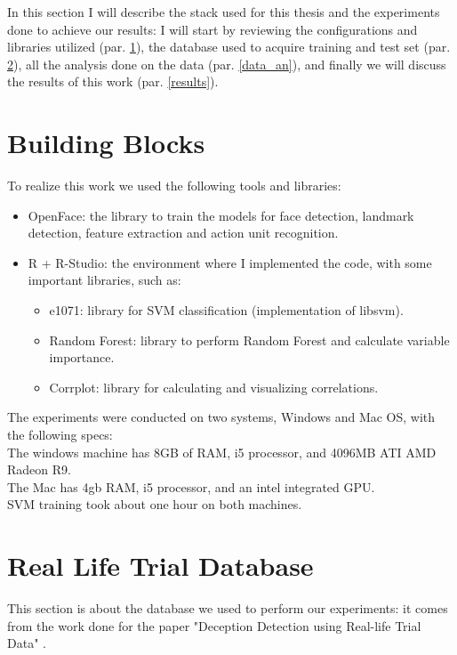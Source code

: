 In this section I will describe the stack used for this thesis and the experiments done to achieve our results: I will start by reviewing the configurations and libraries utilized (par. \ref{bb}), the database used to acquire training and test set (par. \ref{rldb}), all the analysis done on the data (par. \ref{data_an}), and finally we will discuss the results of this work (par. \ref{results}).

\section{Building Blocks} \label{bb}
To realize this work we used the following tools and libraries:
\begin{itemize}
	\item OpenFace: the library to train the models for face detection, landmark detection, feature extraction and action unit recognition.
	\item R + R-Studio: the environment where I implemented the code, with some important libraries, such as:
	\begin{itemize}
		\item e1071: library for SVM classification (implementation of libsvm).
		\item Random Forest: library to perform Random Forest and calculate variable importance.
		\item Corrplot: library for calculating and visualizing correlations.
	\end{itemize}
\end{itemize}

The experiments were conducted on two systems, Windows and Mac OS, with the following specs:\\
The windows machine has 8GB of RAM, i5 processor, and 4096MB ATI AMD Radeon R9. \\
The Mac has 4gb RAM, i5 processor, and an intel integrated GPU.\\
SVM training took about one hour on both machines.

\clearpage

\section{Real Life Trial Database} \label{rldb}
This section is about the database we used to perform our experiments: it comes from the work done for the paper "Deception Detection using Real-life Trial Data" \cite{Perez-Rosas:2015:DDU:2818346.2820758}.


